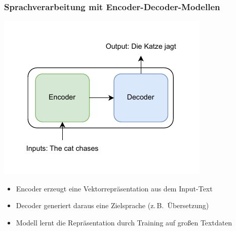 \endgroup


\begingroup
\frametitle{Sprachverarbeitung mit Encoder-Decoder-Modellen}
\begin{frame}
	\centering
	\includegraphics[width=0.4\linewidth]{BilderPräsentation/encoder_decoder.pdf}
	
	\begin{itemize}
		\item Encoder erzeugt eine Vektorrepräsentation aus dem Input-Text
		\item Decoder generiert daraus eine Zielsprache (z.\,B.\ Übersetzung)
		\item Modell lernt die Repräsentation durch Training auf großen Textdaten
	\end{itemize}
\end{frame}


\endgroup



